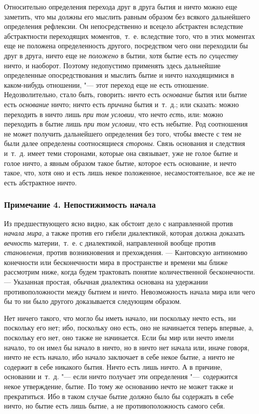Относительно определения перехода друг в друга бытия и ничто можно еще
заметить, что мы должны его мыслить равным образом без всякого дальнейшего
определения рефлексии. Он непосредственно и всецело абстрактен вследствие
абстрактности переходящих моментов,~т.~е. вследствие того, что в этих
моментах еще не положена определенность другого, посредством чего они
переходили бы друг в друга, ничто еще не {\em положено}
в бытии, хотя бытие есть {\em по существу} ничто, и
наоборот. Поэтому недопустимо применять здесь дальнейшие определенные
опосредствования и мыслить бытие и ничто находящимися в каком-нибудь
отношении, "--- этот переход еще не есть отношение. Недозволительно, стало
быть, говорить: ничто есть {\em основание} бытия или
бытие есть {\em основание} ничто; ничто есть
{\em причина} бытия и~т.~д.; или сказать: можно
переходить в ничто лишь {\em при том условии}, что
нечто {\em есть}, или: можно переходить в бытие лишь
{\em при том условии}, что есть небытие. Род
соотношения не может получить дальнейшего определения без того, чтобы
вместе с тем не были далее определены соотносящиеся
{\em стороны}. Связь основания и следствия и~т.~д.
имеет теми сторонами, которые она связывает, уже не голое бытие и голое
ничто, а явным образом такое бытие, которое есть основание, и нечто такое,
что, хотя оно и есть лишь некое положенное, несамостоятельное, все же не
есть абстрактное ничто.

\subsubsection[Примечание 4. Непостижимость начала]
{Примечание 4. Непостижимость начала}

Из предшествующего ясно видно, как обстоит дело с направленной против
{\em начала мира}, а также против его гибели
диалектикой, которая должна доказать {\em вечность}
материи,~т.~е. с диалектикой, направленной вообще против
{\em становления}, против возникновения и прехождения.
--- Кантовскую антиномию конечности или бесконечности мира в пространстве и
времени мы ближе рассмотрим ниже, когда будем трактовать понятие
количественной бесконечности. --- Указанная простая, обычная диалектика
основана на удержании противоположности между бытием и ничто. Невозможность
начала мира или чего бы то ни было другого доказывается следующим образом.

Нет ничего такого, что могло бы иметь начало, ни поскольку нечто есть, ни
поскольку его нет; ибо, поскольку оно есть, оно не начинается теперь
впервые, а, поскольку его нет, оно также не начинается. Если бы мир или
нечто имели начало, то он имел бы начало в ничто, но в ничто нет начала
или, иначе говоря, ничто не есть начало, ибо начало заключает в себе некое
бытие, а ничто не содержит в себе никакого бытия. Ничто есть лишь ничто. А
в причине, основании и~т.~д. "--- если ничто получает эти определения
"---~содержится некое утверждение, бытие. По тому же основанию нечто не может
также и прекратиться. Ибо в таком случае бытие должно было бы содержать в
себе ничто, но бытие есть лишь бытие, а не противоположность самого себя.

